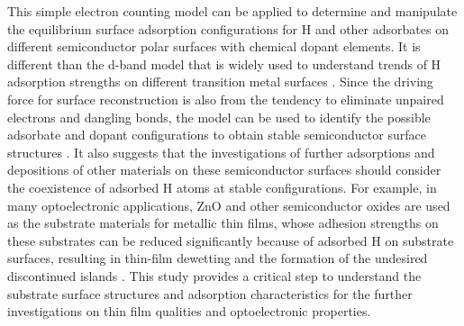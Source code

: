 This simple electron counting model can be applied to determine and manipulate the equilibrium surface adsorption configurations for H and other adsorbates on different semiconductor polar surfaces with chemical dopant elements. It is different than the d-band model that is widely used to understand trends of H adsorption strengths on different transition metal surfaces \cite{HAMMER95,Kibler05}. Since the driving force for surface reconstruction is also from the tendency to eliminate unpaired electrons and dangling bonds, the model can be used to identify the possible adsorbate and dopant configurations to obtain stable semiconductor surface structures \cite{Kaxiras87,pashley1989electron, Jacobs16ZnO}. It also suggests that the investigations of further adsorptions and depositions of other materials on these semiconductor surfaces should consider the coexistence of adsorbed H atoms at stable configurations. For example,  in many optoelectronic applications, ZnO and other semiconductor oxides are used as the substrate materials for metallic thin films, whose adhesion strengths on these substrates can be reduced significantly because of adsorbed H on substrate surfaces, resulting in thin-film dewetting and the formation of the undesired discontinued islands \cite{lin2007density,duriau2006growth}. This study provides a critical step to understand the substrate surface structures and adsorption characteristics for the further investigations on thin film qualities and optoelectronic properties.